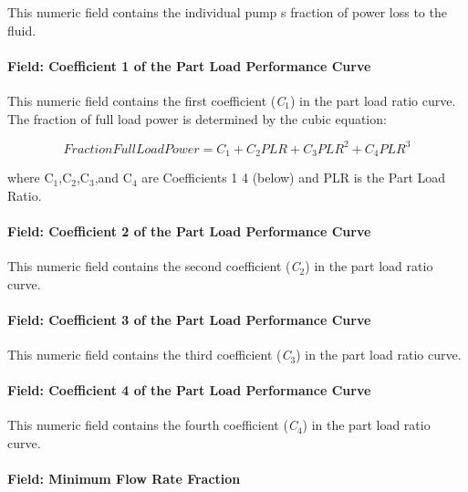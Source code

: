 This numeric field contains the individual pump s fraction of power loss to the fluid.

\paragraph{Field: Coefficient 1 of the Part Load Performance Curve}\label{field-coefficient-1-of-the-part-load-performance-curve-2}

This numeric field contains the first coefficient (\emph{C\(_{1}\)}) in the part load ratio curve. The fraction of full load power is determined by the cubic equation:

\begin{equation}
FractionFullLoadPower = {C_1} + {C_2}PLR + {C_3}PL{R^2} + {C_4}PL{R^3}
\end{equation}

where C\(_{1}\),C\(_{2}\),C\(_{3}\),and C\(_{4}\) are Coefficients 1 4 (below) and PLR is the Part Load Ratio.

\paragraph{Field: Coefficient 2 of the Part Load Performance Curve}\label{field-coefficient-2-of-the-part-load-performance-curve-2}

This numeric field contains the second coefficient (\emph{C\(_{2}\)}) in the part load ratio curve.

\paragraph{Field: Coefficient 3 of the Part Load Performance Curve}\label{field-coefficient-3-of-the-part-load-performance-curve-2}

This numeric field contains the third coefficient (\emph{C\(_{3}\)}) in the part load ratio curve.

\paragraph{Field: Coefficient 4 of the Part Load Performance Curve}\label{field-coefficient-4-of-the-part-load-performance-curve-2}

This numeric field contains the fourth coefficient (\emph{C\(_{4}\)}) in the part load ratio curve.

\paragraph{Field: Minimum Flow Rate Fraction}\label{field-minimum-flow-rate-fraction}

